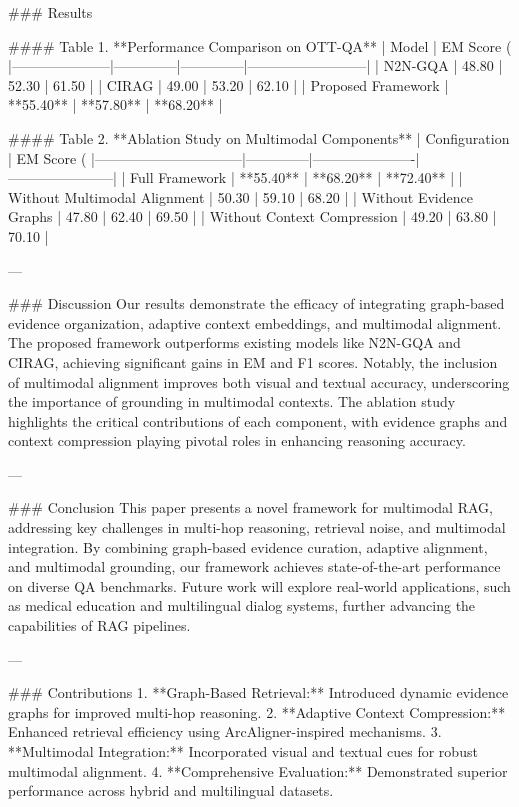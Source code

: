 ### Results  

#### Table 1. **Performance Comparison on OTT-QA**  
| Model               | EM Score (%
|---------------------|--------------|--------------|--------------------------|  
| N2N-GQA            | 48.80        | 52.30        | 61.50                   |  
| CIRAG              | 49.00        | 53.20        | 62.10                   |  
| Proposed Framework | **55.40**    | **57.80**    | **68.20**               |  

#### Table 2. **Ablation Study on Multimodal Components**  
| Configuration                  | EM Score (%
|--------------------------------|--------------|----------------------|-----------------------|  
| Full Framework                 | **55.40**    | **68.20**           | **72.40**            |  
| Without Multimodal Alignment   | 50.30        | 59.10               | 68.20                |  
| Without Evidence Graphs        | 47.80        | 62.40               | 69.50                |  
| Without Context Compression    | 49.20        | 63.80               | 70.10                |  

---

### Discussion  
Our results demonstrate the efficacy of integrating graph-based evidence organization, adaptive context embeddings, and multimodal alignment. The proposed framework outperforms existing models like N2N-GQA and CIRAG, achieving significant gains in EM and F1 scores. Notably, the inclusion of multimodal alignment improves both visual and textual accuracy, underscoring the importance of grounding in multimodal contexts. The ablation study highlights the critical contributions of each component, with evidence graphs and context compression playing pivotal roles in enhancing reasoning accuracy.

---

### Conclusion  
This paper presents a novel framework for multimodal RAG, addressing key challenges in multi-hop reasoning, retrieval noise, and multimodal integration. By combining graph-based evidence curation, adaptive alignment, and multimodal grounding, our framework achieves state-of-the-art performance on diverse QA benchmarks. Future work will explore real-world applications, such as medical education and multilingual dialog systems, further advancing the capabilities of RAG pipelines.

---

### Contributions  
1. **Graph-Based Retrieval:** Introduced dynamic evidence graphs for improved multi-hop reasoning.  
2. **Adaptive Context Compression:** Enhanced retrieval efficiency using ArcAligner-inspired mechanisms.  
3. **Multimodal Integration:** Incorporated visual and textual cues for robust multimodal alignment.  
4. **Comprehensive Evaluation:** Demonstrated superior performance across hybrid and multilingual datasets.  


